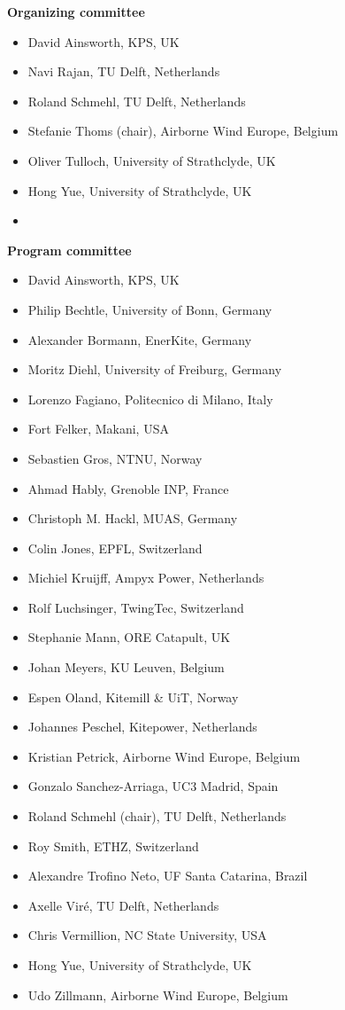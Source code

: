 \begin{multicols}{2}
\textbf{\Large Organizing committee}\\
\begin{itemize}
\item David Ainsworth, KPS, UK
\item Navi Rajan, TU Delft, Netherlands
\item Roland Schmehl, TU Delft, Netherlands
\item Stefanie Thoms (chair), Airborne Wind Europe, Belgium
\item Oliver Tulloch, University of Strathclyde, UK
\item Hong Yue, University of Strathclyde, UK
\item[]
\end{itemize}

\textbf{\Large Program committee}\\
\begin{itemize}
\item David Ainsworth, KPS, UK
\item Philip Bechtle, University of Bonn, Germany
\item Alexander Bormann, EnerKite, Germany
\item Moritz Diehl, University of Freiburg, Germany
\item Lorenzo Fagiano, Politecnico di Milano, Italy
\item Fort Felker, Makani, USA
\item Sebastien Gros, NTNU, Norway
\item Ahmad Hably, Grenoble INP, France
\item Christoph M. Hackl, MUAS, Germany
\item Colin Jones, EPFL, Switzerland
\item Michiel Kruijff, Ampyx Power, Netherlands
\item Rolf Luchsinger, TwingTec, Switzerland
\item Stephanie Mann, ORE Catapult, UK
\item Johan Meyers, KU Leuven, Belgium
\item Espen Oland, Kitemill \& UiT, Norway
\item Johannes Peschel, Kitepower, Netherlands
\item Kristian Petrick, Airborne Wind Europe, Belgium
\item Gonzalo Sanchez-Arriaga, UC3 Madrid, Spain
\item Roland Schmehl (chair), TU Delft, Netherlands
\item Roy Smith, ETHZ, Switzerland
\item Alexandre Trofino Neto, UF Santa Catarina, Brazil
\item Axelle Viré, TU Delft, Netherlands
\item Chris Vermillion, NC State University, USA
\item Hong Yue, University of Strathclyde, UK
\item Udo Zillmann, Airborne Wind Europe, Belgium
\end{itemize}
\vfill

\end{multicols}

